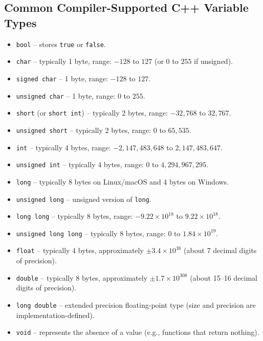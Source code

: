 \documentclass[10pt]{article}
\begin{document}
\subsection{Common Compiler-Supported C++ Variable Types}
\begin{itemize}
    \item \verb|bool| -- stores \verb|true| or \verb|false|.
    \item \verb|char| -- typically 1 byte, range: $-128$ to $127$ (or $0$ to $255$ if unsigned).
    \item \verb|signed char| -- 1 byte, range: $-128$ to $127$.
    \item \verb|unsigned char| -- 1 byte, range: $0$ to $255$.
    \item \verb|short| (or \verb|short int|) -- typically 2 bytes, range: $-32,\!768$ to $32,\!767$.
    \item \verb|unsigned short| -- typically 2 bytes, range: $0$ to $65,\!535$.
    \item \verb|int| -- typically 4 bytes, range: $-2,\!147,\!483,\!648$ to $2,\!147,\!483,\!647$.
    \item \verb|unsigned int| -- typically 4 bytes, range: $0$ to $4,\!294,\!967,\!295$.
    \item \verb|long| -- typically 8 bytes on Linux/macOS and 4 bytes on Windows.
    \item \verb|unsigned long| -- unsigned version of \verb|long|.
    \item \verb|long long| -- typically 8 bytes, range: $-9.22\times10^{18}$ to $9.22\times10^{18}$.
    \item \verb|unsigned long long| -- typically 8 bytes, range: $0$ to $1.84\times10^{19}$.
    \item \verb|float| -- typically 4 bytes, approximately $\pm 3.4\times10^{38}$ (about 7 decimal digits of precision).
    \item \verb|double| -- typically 8 bytes, approximately $\pm 1.7\times10^{308}$ (about 15--16 decimal digits of precision).
    \item \verb|long double| -- extended precision floating-point type (size and precision are implementation-defined).
    \item \verb|void| -- represents the absence of a value (e.g., functions that return nothing).
\end{itemize}
\end{document}
